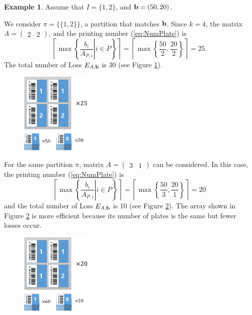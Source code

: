 \documentclass[a4paper]{amsart}
\numberwithin{equation}{section} %
\numberwithin{figure}{section} %
\numberwithin{table}{section}
\theoremstyle{plain}
\theoremstyle{definition}
\newtheorem{example}[thm]{Example}
\theoremstyle{plain}
\theoremstyle{plain}
\theoremstyle{plain}
\theoremstyle{plain}
\theoremstyle{plain}
\begin{document}
\begin{example}
	Assume that $I=\{1,2\}$, and ${\bf b}=(50,20)$.
	
	We consider $\pi = \{\{1,2\}\}$, a partition that matches ${\bf b}$. Since $k = 4$, 
	the matrix $A = (\begin{array}{cc}2 & 2\end{array})$, and the printing number (\ref{eq:NumPlate}) is 
	\begin{equation}
	\left\lceil \max\left\{ \left. \frac{b_{i}}{A_{P,i}} \right| i \in P \right\} \right\rceil = \left\lceil \max \left\{ \frac{50}{2}, \frac{20}{2} \right\} \right\rceil = 25.
	\end{equation}
	The total number of Loss $E_{A,{\bf b}}$ is 30 (see Figure \ref{fig:ex21}).
	
	\begin{figure}[h!]
		\centering
		\includegraphics[width=3.5cm]{ex21.pdf}
		\caption{}
		\label{fig:ex21}       %
	\end{figure}
	
	For the same partition $\pi$, matrix $A = (\begin{array}{cc}3 & 1\end{array})$ can be considered. In this case, the printing number (\ref{eq:NumPlate}) is 
	\begin{equation}
	\left\lceil \max\left\{ \left. \frac{b_{i}}{A_{P,i}} \right| i \in P \right\} \right\rceil = \left\lceil \max \left\{ \frac{50}{3}, \frac{20}{1} \right\} \right\rceil = 20
	\end{equation}
	and the total number of Loss $E_{A,{\bf b}}$ is 10 (see Figure \ref{fig:ex22}).
	The array shown in Figure \ref{fig:ex22} is more efficient because its number of plates is the same but fewer losses occur.
	\begin{figure}[h!]
		\centering
		\includegraphics[width=3.5cm]{ex22.pdf}
		\caption{}
		\label{fig:ex22}       %
	\end{figure}
\end{example}
\end{document}
